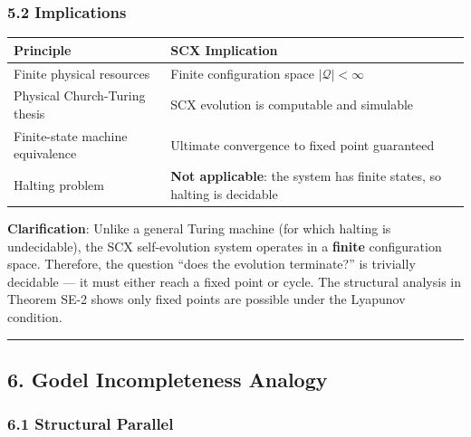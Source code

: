 \documentclass[
  12pt,
]{article}
\begin{document}
\subsubsection{5.2 Implications}\label{implications}

\begin{longtable}[]{@{}
  >{\raggedright\arraybackslash}p{}
  >{\raggedright\arraybackslash}p{}@{}}
\toprule\noalign{}
\begin{minipage}[b]{\linewidth}\raggedright
Principle
\end{minipage} & \begin{minipage}[b]{\linewidth}\raggedright
SCX Implication
\end{minipage} \\
\midrule\noalign{}
\endhead
\bottomrule\noalign{}
\endlastfoot
Finite physical resources & Finite configuration space
\(|\mathcal{Q}| < \infty\) \\
Physical Church-Turing thesis & SCX evolution is computable and
simulable \\
Finite-state machine equivalence & Ultimate convergence to fixed point
guaranteed \\
Halting problem & \textbf{Not applicable}: the system has finite states,
so halting is decidable \\
\end{longtable}

\textbf{Clarification}: Unlike a general Turing machine (for which
halting is undecidable), the SCX self-evolution system operates in a
\textbf{finite} configuration space. Therefore, the question ``does the
evolution terminate?'' is trivially decidable --- it must either reach a
fixed point or cycle. The structural analysis in Theorem SE-2 shows only
fixed points are possible under the Lyapunov condition.

\begin{center}\rule{0.5\linewidth}{0.5pt}\end{center}

\subsection{6. Godel Incompleteness
Analogy}\label{godel-incompleteness-analogy}

\subsubsection{6.1 Structural Parallel}\label{structural-parallel}
\end{document}
